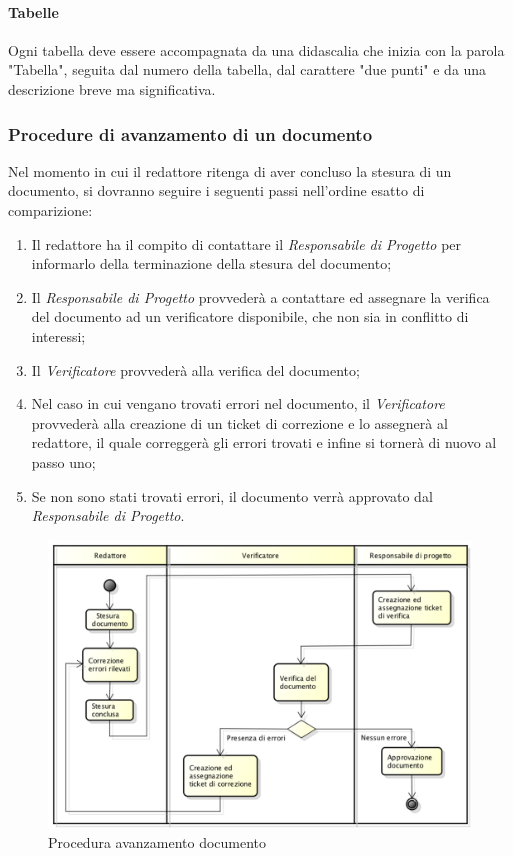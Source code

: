 \paragraph{Tabelle}
Ogni tabella deve essere accompagnata da una didascalia che inizia con la parola "Tabella", seguita dal numero della tabella, dal carattere "due punti" e da una  descrizione breve ma significativa.

\newpage
\subsubsection{Procedure di avanzamento di un documento}
Nel momento in cui il redattore ritenga di aver concluso la stesura di un documento, si dovranno seguire i seguenti passi nell'ordine esatto di comparizione:
\begin{enumerate}
	\item Il redattore ha il compito di contattare il \textit{Responsabile di Progetto} per informarlo della terminazione della stesura del documento;
	\item Il \textit{Responsabile di Progetto} provvederà a contattare ed assegnare la verifica del documento ad un verificatore disponibile, che non sia in conflitto di interessi;
	\item Il \textit{Verificatore} provvederà alla  verifica del documento;
	\item Nel caso in cui vengano trovati errori nel documento, il \textit{Verificatore} provvederà alla creazione di un \gls{ticket} di correzione e lo assegnerà al redattore, il quale correggerà gli errori trovati e infine si tornerà di nuovo al passo uno;
	\item Se non sono stati trovati errori, il documento verrà approvato dal \textit{Responsabile di Progetto}. 
\end{enumerate}
\begin{figure}[h]
\centering
\includegraphics[width=1\linewidth]{img/proceduraDocumenti}
\caption[Procedura avanzamento documento]{Procedura avanzamento documento}
\label{fig:proceduraDocumenti}
\end{figure}






